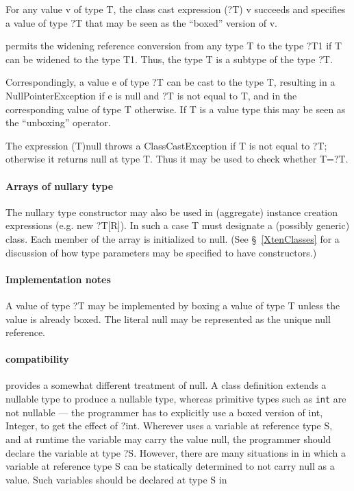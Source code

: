 For any value {\cf v} of type {\cf T}, the class cast expression {\cf
(?T) v} succeeds and specifies a value of type {\cf ?T} that may be
seen as the ``boxed'' version of {\cf v}.

\Xten{} permits the widening reference conversion from any type {\cf T}
to the type {\cf ?T1} if {\cf T} can be widened to the type {\cf
T1}. Thus, the type {\cf T} is a subtype of the type {\cf ?T}.

Correspondingly, a value {\cf e} of type {\cf ?T} can be cast to the
type {\cf T}, resulting in a {\cf NullPointerException} if {\cf e} is
{\cf null} and {\cf ?T} is not equal to {\cf T}, and in the
corresponding value of type {\cf T} otherwise.  If {\cf T} is a value
type this may be seen as the ``unboxing'' operator.

The expression {\cf (T)null} throws a {\cf ClassCastException} if {\cf
T} is not equal to {\cf ?T}; otherwise it returns {\cf null} at type
{\cf T}. Thus it may be used to check whether {\cf T=?T}.

\paragraph{Arrays of nullary type}
The nullary type constructor may also be used in (aggregate) instance
creation expressions (e.g.{} {\cf new ?T[R]}). In such a case {\cf T}
must designate a (possibly generic) class. Each member of the array is
initialized to {\cf null}. (See \S~\ref{XtenClasses} for a discussion of how
type parameters may be specified to have constructors.)

\paragraph{Implementation notes}

A value of type {\cf ?T} may be implemented by boxing a value of
type {\cf T} unless the value is already boxed. The literal {\cf null}
may be represented as the unique null reference.

\paragraph{\Java{} compatibility}

\java{} 
provides a somewhat different treatment of {\cf null}.  A class
definition extends a nullable type to produce a nullable type, whereas
primitive types such as {\tt int} are not nullable --- the programmer
has to explicitly use a boxed version of {\cf int}, {\cf Integer}, to
get the effect of {\cf ?int}. Wherever \Java{} uses a variable at
reference type {\cf S}, and at runtime the variable may carry the
value {\cf null}, the \Xten{} programmer should declare the variable at
type {\cf ?S}. However, there are many situations in \java{} in which
a variable at reference type {\cf S} can be statically determined to
not carry null as a value. Such variables should be declared at type {\cf S}
in \Xten{}

